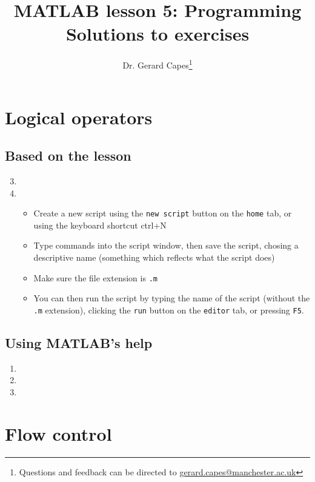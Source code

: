 \documentclass{article}
\title{MATLAB lesson 5: Programming\\Solutions to exercises}
\date{}
\author{Dr. Gerard Capes\thanks{Questions and feedback can be directed to \href{mailto:gerard.capes@manchester.ac.uk?subject=Feedback on MATLAB lesson 5 (programming) solutions sheet}{gerard.capes@manchester.ac.uk}}}
\begin{document}
	\maketitle
	
	\section{Logical operators}
	\subsection*{Based on the lesson}
		\begin{enumerate}
			\setcounter{enumi}{2}
			\item 
			\item 
			\begin{itemize}
				\item Create a new script using the \texttt{new script} button on the \texttt{home} tab, or using the keyboard shortcut ctrl+N
				\item Type commands into the script window, then save the script, chosing a descriptive name (something which reflects what the script does)
				\item Make sure the file extension is \texttt{.m} 
				\item You can then run the script by typing the name of the script (without the \texttt{.m} extension), clicking the \texttt{run} button on the \texttt{editor} tab, or pressing \texttt{F5}.
			\end{itemize}
		\end{enumerate}
	\subsection*{Using MATLAB's help}
	\begin{enumerate}[resume]
		\item 
		
		\item 
		
		\item 
	\end{enumerate}
	
	\section{Flow control}
\end{document}
